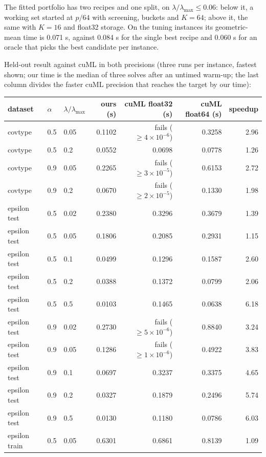 \documentclass[11pt]{article}
\begin{document}
The fitted portfolio has two recipes and one split, on $\lambda/\lambda_{\max}\le0.06$:
below it, a working set started at $p/64$ with screening, buckets and $K=64$; above it,
the same with $K=16$ and float32 storage. On the tuning instances its geometric-mean
time is 0.071 s, against 0.084 s for the single best recipe and 0.060 s for an oracle
that picks the best candidate per instance.

Held-out result against cuML in both precisions (three runs per instance, fastest
shown; our time is the median of three solves after an untimed warm-up; the last
column divides the faster cuML precision that reaches the target by our time):

\begin{center}
\small
\begin{tabular}{lllrrrr}
\toprule
dataset & $\alpha$ & $\lambda/\lambda_{\max}$ & ours (s) & cuML float32 (s) & cuML float64 (s) & speedup \\
\midrule
covtype & 0.5 & 0.05 & 0.1102 & fails ($\ge4\times10^{-6}$) & 0.3258 & 2.96 \\
covtype & 0.5 & 0.2 & 0.0552 & 0.0698 & 0.0778 & 1.26 \\
covtype & 0.9 & 0.05 & 0.2265 & fails ($\ge3\times10^{-5}$) & 0.6153 & 2.72 \\
covtype & 0.9 & 0.2 & 0.0670 & fails ($\ge2\times10^{-5}$) & 0.1330 & 1.98 \\
epsilon test & 0.5 & 0.02 & 0.2380 & 0.3296 & 0.3679 & 1.39 \\
epsilon test & 0.5 & 0.05 & 0.1806 & 0.2085 & 0.2931 & 1.15 \\
epsilon test & 0.5 & 0.1 & 0.0499 & 0.1296 & 0.1587 & 2.60 \\
epsilon test & 0.5 & 0.2 & 0.0388 & 0.1372 & 0.0799 & 2.06 \\
epsilon test & 0.5 & 0.5 & 0.0103 & 0.1465 & 0.0638 & 6.18 \\
epsilon test & 0.9 & 0.02 & 0.2730 & fails ($\ge5\times10^{-6}$) & 0.8840 & 3.24 \\
epsilon test & 0.9 & 0.05 & 0.1286 & fails ($\ge1\times10^{-6}$) & 0.4922 & 3.83 \\
epsilon test & 0.9 & 0.1 & 0.0697 & 0.3237 & 0.3375 & 4.65 \\
epsilon test & 0.9 & 0.2 & 0.0327 & 0.1879 & 0.2496 & 5.74 \\
epsilon test & 0.9 & 0.5 & 0.0130 & 0.1180 & 0.0786 & 6.03 \\
epsilon train & 0.5 & 0.05 & 0.6301 & 0.6861 & 0.8139 & 1.09 \\

\end{tabular}
\end{center}
\end{document}
